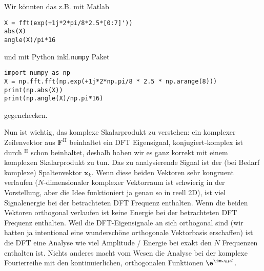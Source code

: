 \begin{ExCalc}

%
Wir könnten das z.B. mit Matlab
\begin{verbatim}
X = fft(exp(+1j*2*pi/8*2.5*[0:7]'))
abs(X)
angle(X)/pi*16
\end{verbatim}
und mit Python inkl.\texttt{numpy} Paket
\begin{verbatim}
import numpy as np
X = np.fft.fft(np.exp(+1j*2*np.pi/8 * 2.5 * np.arange(8)))
print(np.abs(X))
print(np.angle(X)/np.pi*16)
\end{verbatim}
gegenchecken.
%

Nun ist wichtig, das komplexe Skalarprodukt zu verstehen: ein komplexer
Zeilenvektor aus $\bm{F}^\mathrm{H}$ beinhaltet ein DFT Eigensignal,
konjugiert-komplex ist durch $^\mathrm{H}$ schon beinhaltet,
deshalb haben wir es ganz korrekt mit einem komplexen Skalarprodukt zu tun.
Das zu analysierende Signal ist der (bei Bedarf komplexe) Spaltenvektor $\bm{x}_k$.
Wenn diese beiden Vektoren sehr kongruent verlaufen ($N$-dimensionaler
komplexer Vektorraum ist schwierig in der Vorstellung, aber die Idee funktioniert
ja genau so in reell 2D), ist viel Signalenergie
bei der betrachteten DFT Frequenz enthalten. Wenn die beiden Vektoren orthogonal
verlaufen ist keine Energie bei der betrachteten DFT Frequenz enthalten.
%
Weil die DFT-Eigensignale an sich orthogonal sind (wir hatten ja intentional
eine wunderschöne orthogonale
Vektorbasis erschaffen) ist die DFT eine Analyse wie viel Amplitude / Energie
bei exakt den $N$ Frequenzen enthalten ist. Nichts anderes macht vom Wesen
die Analyse bei der komplexe Fourierreihe mit den kontinuierlichen, orthogonalen
Funktionen $\e^{\im\omega_0 \mu t}$.
%


\end{ExCalc}
